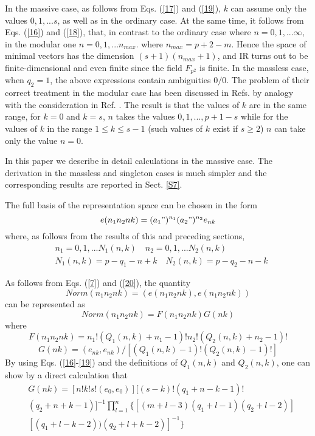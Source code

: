 \documentclass[a4paper,12pt]{article}%
\begin{document}
In the massive case, as follows from Eqs. (\ref{17}) and
(\ref{19}), $k$ can assume only the values $0,1,...s$, as well
as in the ordinary case. At the same time, it follows from Eqs.
(\ref{16}) and (\ref{18}), that, in contrast to the ordinary 
case where $n=0,1,...\infty$, in the modular one $n=0,1,...n_{max}$. 
where $n_{max}=p+2-m$. Hence the space of minimal vectors has the 
dimension $(s+1)(n_{max}+1)$,
and IR turns out to be finite-dimensional and even finite since
the field $F_{p^2}$ is finite. In the massless case, when $q_2=1$,
the above expressions contain ambiguities $0/0$. The problem of
their correct treatment in the modular case has been discussed in Refs.
\cite{lev2,lev3} by analogy with the consideration in Ref. \cite{Evans}.
The result is that the values of $k$ are in the same range, for $k=0$
and $k=s$, $n$ takes the values $0,1,...,p+1-s$ while for the values
of $k$ in the range $1\leq k \leq s-1$ (such values of $k$ exist if 
$s\geq 2$) $n$ can take only the value $n=0$.

In this paper we describe in detail calculations in the massive 
case. The derivation in the massless and singleton cases is 
much simpler and the corresponding results are reported in 
Sect. \ref{S7}.
   
The full basis of the representation space can be chosen in the
form 
\begin{equation}
e(n_1n_2nk)=(a_1")^{n_1}(a_2")^{n_2}e_{nk} 
\label{20}
\end{equation}
where, as follows from the
results of this and preceding sections, 
\begin{eqnarray}
&n_1=0,1,...N_1(n,k)\quad n_2=0,1,...N_2(n,k)\nonumber\\
&N_1(n,k)=p-q_1-n+k\quad N_2(n,k)=p-q_2-n-k
\label{21}
\end{eqnarray}

As follows from Eqs. (\ref{7}) and (\ref{20}), the quantity 
\begin{equation}
Norm(n_1n_2nk)=(e(n_1n_2nk),e(n_1n_2nk))
\label{22}
\end{equation}
can be represented as
\begin{equation}
Norm(n_1n_2nk)=F(n_1n_2nk)G(nk)
\label{23}
\end{equation}
where 
\begin{equation}
F(n_1n_2nk)= n_1!(Q_1(n,k)+n_1-1)!n_2!(Q_2(n,k)+n_2-1)!
\label{24}
\end{equation}
\begin{equation}
G(nk)=(e_{nk},e_{nk})/[(Q_1(n,k)-1)!(Q_2(n,k)-1)!]
\label{25}
\end{equation}
By using Eqs. (\ref{16}-\ref{19}) and the definitions of 
$Q_1(n,k)$ and
$Q_2(n,k)$, one can show by a direct calculation that
\begin{eqnarray}
&G(nk)=[n!k!s!(e_0,e_0)][(s-k)!(q_1+n-k-1)!\nonumber\\
&(q_2+n+k-1)]^{-1}\prod_{l=1}^{n} \{[(m+l-3)(q_1+l-1)(q_2+l-2)]\nonumber\\
&[(q_1+l-k-2))(q_2+l+k-2)]^{-1}\} 
\label{26}
\end{eqnarray}
\end{document}
